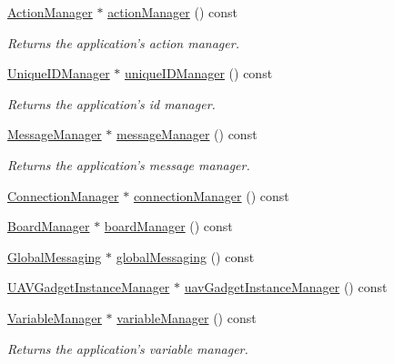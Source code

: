 \begin{DoxyCompactItemize}
\hyperlink{class_core_1_1_action_manager}{Action\-Manager} $\ast$ \hyperlink{group___core_plugin_gae1378eb075199d7212531112dad29d22}{action\-Manager} () const 
\begin{DoxyCompactList}\small\item\em Returns the application's action manager. \end{DoxyCompactList}\item 
\hyperlink{class_core_1_1_unique_i_d_manager}{Unique\-I\-D\-Manager} $\ast$ \hyperlink{group___core_plugin_gaab7eddca1a8fee6f0012a73ff3104ac9}{unique\-I\-D\-Manager} () const 
\begin{DoxyCompactList}\small\item\em Returns the application's id manager. \end{DoxyCompactList}\item 
\hyperlink{class_core_1_1_message_manager}{Message\-Manager} $\ast$ \hyperlink{group___core_plugin_ga0e83f695186bf1d3538da3033a3f39ce}{message\-Manager} () const 
\begin{DoxyCompactList}\small\item\em Returns the application's message manager. \end{DoxyCompactList}\item 
\hyperlink{class_core_1_1_connection_manager}{Connection\-Manager} $\ast$ \hyperlink{group___core_plugin_ga363477297c4c3033bde34c08df39aadd}{connection\-Manager} () const 
\item 
\hyperlink{class_core_1_1_board_manager}{Board\-Manager} $\ast$ \hyperlink{group___core_plugin_ga93b0c02bac385343c0968723fad3504a}{board\-Manager} () const 
\item 
\hyperlink{class_core_1_1_global_messaging}{Global\-Messaging} $\ast$ \hyperlink{group___core_plugin_gabb3447bd5a5c494dbbcc3ffd017ddfe5}{global\-Messaging} () const 
\item 
\hyperlink{class_core_1_1_u_a_v_gadget_instance_manager}{U\-A\-V\-Gadget\-Instance\-Manager} $\ast$ \hyperlink{group___core_plugin_ga819fa53b14bc8ca57f9354b74bf35284}{uav\-Gadget\-Instance\-Manager} () const 
\item 
\hyperlink{class_core_1_1_variable_manager}{Variable\-Manager} $\ast$ \hyperlink{group___core_plugin_ga5c0c3fc105c7bd329fe52f4be0acef22}{variable\-Manager} () const 
\begin{DoxyCompactList}\small\item\em Returns the application's variable manager. \end{DoxyCompactList}\item 

\end{DoxyCompactItemize}
